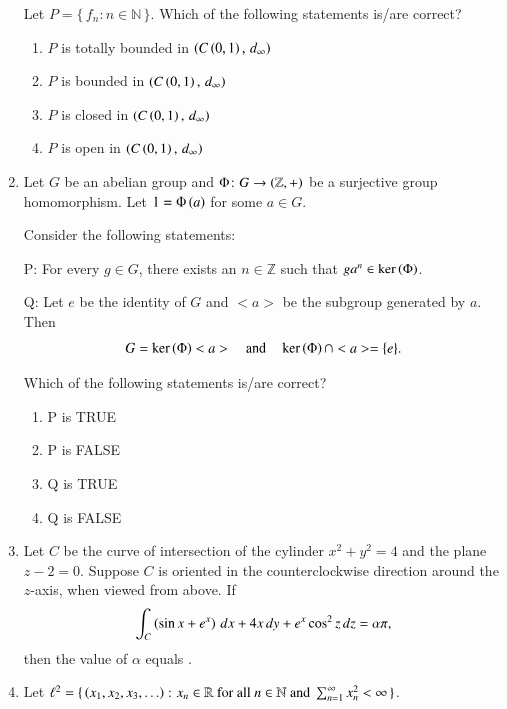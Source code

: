 \documentclass[journal,12pt,onecolumn]{IEEEtran}
\theoremstyle{remark}
\begin{document}
\begin{enumerate}[start=1, label=Q.\arabic*]
Let $P=\{\, f_{n} \colon n\in \mathbb{N} \,\}$. Which of the following statements is/are correct?
\begin{enumerate}
\item $P$ is totally bounded in $\left(C\left(0,1\right),\, d_{\infty}\right)$
\item $P$ is bounded in $\left(C\left(0,1\right),\, d_{\infty}\right)$
\item $P$ is closed in $\left(C\left(0,1\right),\, d_{\infty}\right)$
\item $P$ is open in $\left(C\left(0,1\right),\, d_{\infty}\right)$
\end{enumerate}

\hfill{}
\item Let $G$ be an abelian group and $\Phi \colon G \to \left(\mathbb{Z},+\right)$ be a surjective group homomorphism. Let $1=\Phi\left(a\right)$ for some $a\in G$.  

Consider the following statements:  

P: For every $g\in G$, there exists an $n\in \mathbb{Z}$ such that $ga^{n}\in \ker\left(\Phi\right)$.  

Q: Let $e$ be the identity of $G$ and $<a>$ be the subgroup generated by $a$. Then  
\[
G=\ker\left(\Phi\right)<a> \quad \text{and} \quad \ker\left(\Phi\right)\cap <a>=\{e\}.
\]

Which of the following statements is/are correct?
\begin{enumerate}
\item P is TRUE
\item P is FALSE
\item Q is TRUE
\item Q is FALSE
\end{enumerate}

\hfill{}


\item Let $C$ be the curve of intersection of the cylinder $x^{2}+y^{2}=4$ and the plane $z-2=0$. Suppose $C$ is oriented in the counterclockwise direction around the $z$-axis, when viewed from above. If
\[
\int_{C} \left(\sin x+e^{x}\right)\,dx +4x\,dy+e^{x}\cos^{2}z\,dz = \alpha \pi,
\]
then the value of $\alpha$ equals \underline{\hspace{3cm}}.

\hfill{}


\item Let $\ell^{2}=\{\, \left(x_{1},x_{2},x_{3},\ldots\right) \colon x_{n}\in \mathbb{R} \text{ for all } n\in \mathbb{N} \text{ and } \sum_{n=1}^{\infty} x_{n}^{2}<\infty \,\}$.  


\end{enumerate}
\end{document}
